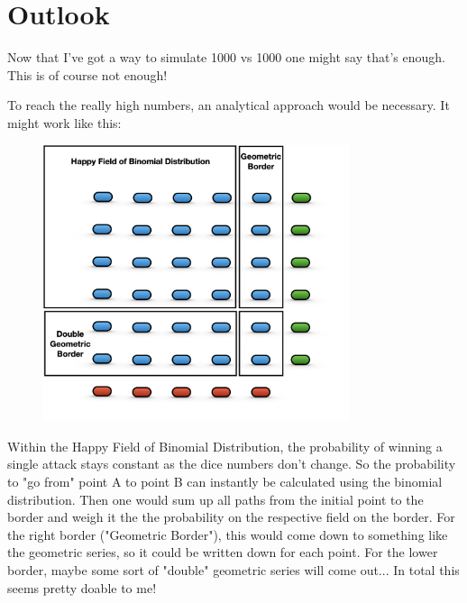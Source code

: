 \documentclass[11pt,a4paper]{article}
\begin{document}
\section{Outlook}
Now that I've got a way to simulate 1000 vs 1000 one might say that's enough. This is of course not enough!

To reach the really high numbers, an analytical approach would be necessary. It might work like this:

\begin{figure}[H]
\centering
\includegraphics[width=0.8\textwidth]{../images/Analytic Interpolation.png}
\end{figure}

Within the Happy Field of Binomial Distribution, the probability of winning a single attack stays constant as the dice numbers don't change. So the probability to "go from" point A to point B can instantly be calculated using the binomial distribution. Then one would sum up all paths from the initial point to the border and weigh it the the probability on the respective field on the border. For the right border ("Geometric Border"), this would come down to something like the geometric series, so it could be written down for each point. For the lower border, maybe some sort of "double" geometric series will come out... In total this seems pretty doable to me!
\end{document}
